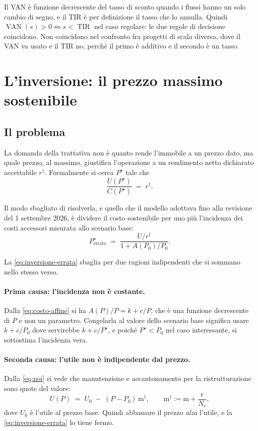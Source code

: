 \documentclass[11pt,a4paper]{article}
\theoremstyle{definition}
\theoremstyle{plain}
\DeclareMathOperator{\VAN}{VAN}
\DeclareMathOperator{\TIR}{TIR}
\begin{document}
Il VAN è funzione decrescente del tasso di sconto quando i flussi hanno un solo cambio di segno, e il TIR è per definizione il tasso che lo annulla. Quindi $\VAN(s)>0 \iff s< \TIR$ nel caso regolare: le due regole di decisione coincidono. Non coincidono nel confronto fra progetti di scala diversa, dove il VAN va usato e il TIR no, perché il primo è additivo e il secondo è un tasso.

\section{L'inversione: il prezzo massimo sostenibile}
\label{sec:inversione}

\subsection{Il problema}

La domanda della trattativa non è quanto rende l'immobile a un prezzo dato, ma quale prezzo, al massimo, giustifica l'operazione a un rendimento netto dichiarato accettabile $r^\dagger$. Formalmente si cerca $P^\star$ tale che
\begin{equation}
\frac{U(P^\star)}{C(P^\star)} \;=\; r^\dagger .
\label{eq:problema-inversione}
\end{equation}

Il modo sbagliato di risolverla, e quello che il modello adottava fino alla revisione del 1 settembre 2026, è dividere il costo sostenibile per uno più l'incidenza dei costi accessori misurata allo scenario base:
\begin{equation}
P^\star_{\text{errato}} \;=\; \frac{U/r^\dagger}{1 + A(P_0)/P_0}.
\label{eq:inversione-errata}
\end{equation}

La \eqref{eq:inversione-errata} sbaglia per due ragioni indipendenti che si sommano nello stesso verso.

\paragraph{Prima causa: l'incidenza non è costante.} Dalla \eqref{eq:costo-affine} si ha $A(P)/P = k + c/P$, che è una funzione decrescente di $P$ e non un parametro. Congelarla al valore dello scenario base significa usare $k + c/P_0$ dove servirebbe $k + c/P^\star$, e poiché $P^\star < P_0$ nel caso interessante, si sottostima l'incidenza vera.

\paragraph{Seconda causa: l'utile non è indipendente dal prezzo.} Dalla \eqref{eq:noi} si vede che manutenzione e accantonamento per la ristrutturazione sono quote del valore:
\begin{equation}
U(P) \;=\; U_0 \;-\; (P-P_0)\,\mathrm{m}^\dagger,
\qquad
\mathrm{m}^\dagger := \mathrm{m} + \frac{\mathrm{r}}{N_r},
\label{eq:utile-di-p}
\end{equation}
dove $U_0$ è l'utile al prezzo base. Quindi abbassare il prezzo \emph{alza} l'utile, e la \eqref{eq:inversione-errata} lo tiene fermo.
\end{document}
